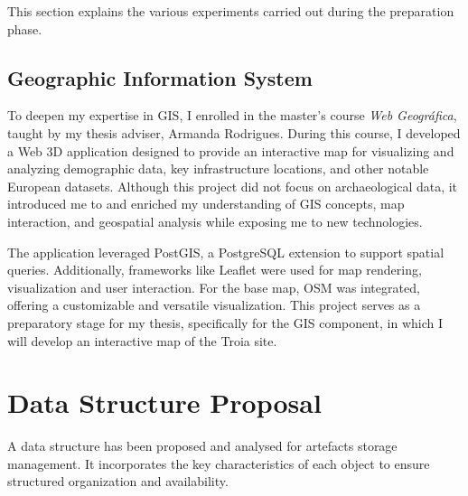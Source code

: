 This section explains the various experiments carried out during the preparation phase.

\subsection{Geographic Information System}
\label{sec:gis_previous} 

To deepen my expertise in \gls{GIS}, I enrolled in the master's course \textit{Web Geográfica}, taught by my thesis adviser, Armanda Rodrigues. During this course, I developed a Web \gls{3D} application designed to provide an interactive map for visualizing and analyzing demographic data, key infrastructure locations, and other notable European datasets. Although this project did not focus on archaeological data, it introduced me to and enriched my understanding of GIS concepts, map interaction, and geospatial analysis while exposing me to new technologies.


The application leveraged PostGIS, a PostgreSQL extension to support spatial queries.
Additionally, frameworks like Leaflet were used for map rendering, visualization and user interaction. For the base map, \gls{OSM} was integrated, offering a customizable and versatile visualization. This project serves as a preparatory stage for my thesis, specifically for the \gls{GIS} component, in which I will develop an interactive map of the Troia site.

\section{Data Structure Proposal}
\label{sec:data_strucutre}

A data structure has been proposed and analysed for artefacts storage management.  
It incorporates the key characteristics of each object to ensure structured organization and availability.



